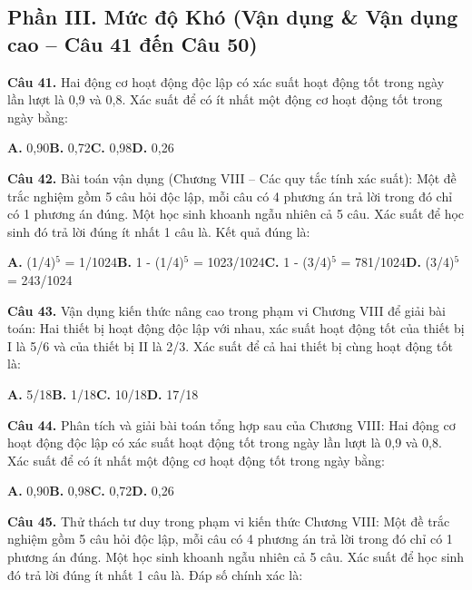 \documentclass[11pt,a4paper]{article}
\begin{document}
\subsection*{\color{accent} Phần III. Mức độ Khó (Vận dụng \& Vận dụng cao -- Câu 41 đến Câu 50)}
\textbf{\color{primary} Câu 41.} Hai động cơ hoạt động độc lập có xác suất hoạt động tốt trong ngày lần lượt là 0,9 và 0,8. Xác suất để có ít nhất một động cơ hoạt động tốt trong ngày bằng:\par
\hspace*{1.5em}\textbf{A.} 0,90\quad\quad \textbf{B.} 0,72\quad\quad \textbf{C.} 0,98\quad\quad \textbf{D.} 0,26\par\vspace{2pt}
\textbf{\color{primary} Câu 42.} Bài toán vận dụng (Chương VIII – Các quy tắc tính xác suất): Một đề trắc nghiệm gồm 5 câu hỏi độc lập, mỗi câu có 4 phương án trả lời trong đó chỉ có 1 phương án đúng. Một học sinh khoanh ngẫu nhiên cả 5 câu. Xác suất để học sinh đó trả lời đúng ít nhất 1 câu là. Kết quả đúng là:\par
\hspace*{1.5em}\textbf{A.} (1/4)$^5$ = 1/1024\quad\quad \textbf{B.} 1 - (1/4)$^5$ = 1023/1024\quad\quad \textbf{C.} 1 - (3/4)$^5$ = 781/1024\quad\quad \textbf{D.} (3/4)$^5$ = 243/1024\par\vspace{2pt}
\textbf{\color{primary} Câu 43.} Vận dụng kiến thức nâng cao trong phạm vi Chương VIII để giải bài toán: Hai thiết bị hoạt động độc lập với nhau, xác suất hoạt động tốt của thiết bị I là 5/6 và của thiết bị II là 2/3. Xác suất để cả hai thiết bị cùng hoạt động tốt là:\par
\hspace*{1.5em}\textbf{A.} 5/18\quad\quad \textbf{B.} 1/18\quad\quad \textbf{C.} 10/18\quad\quad \textbf{D.} 17/18\par\vspace{2pt}
\textbf{\color{primary} Câu 44.} Phân tích và giải bài toán tổng hợp sau của Chương VIII: Hai động cơ hoạt động độc lập có xác suất hoạt động tốt trong ngày lần lượt là 0,9 và 0,8. Xác suất để có ít nhất một động cơ hoạt động tốt trong ngày bằng:\par
\hspace*{1.5em}\textbf{A.} 0,90\quad\quad \textbf{B.} 0,98\quad\quad \textbf{C.} 0,72\quad\quad \textbf{D.} 0,26\par\vspace{2pt}
\textbf{\color{primary} Câu 45.} Thử thách tư duy trong phạm vi kiến thức Chương VIII: Một đề trắc nghiệm gồm 5 câu hỏi độc lập, mỗi câu có 4 phương án trả lời trong đó chỉ có 1 phương án đúng. Một học sinh khoanh ngẫu nhiên cả 5 câu. Xác suất để học sinh đó trả lời đúng ít nhất 1 câu là. Đáp số chính xác là:\par
\end{document}
